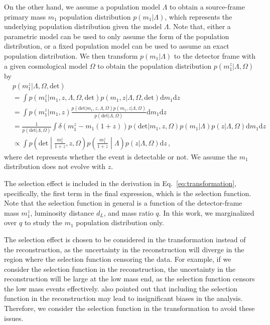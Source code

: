 \documentclass[sn-aps, pdflatex]{sn-jnl}
\begin{document}
On the other hand, we assume a population model $\Lambda$ to obtain a source-frame primary mass $m_1$ population distribution $p(m_1|\Lambda)$, which represents the underlying population distribution given the model $\Lambda$.
Note that, either a parametric model can be used to only assume the form of the population distribution, or a fixed population model can be used to assume an exact population distribution.
We then transform $p(m_1|\Lambda)$ to the detector frame with a given cosmological model $\Omega$ to obtain the population distribution $p(m^z_1|\Lambda, \Omega)$ by
\begin{equation}
    \begin{aligned}
        &p(m^z_1|\Lambda, \Omega, \mathrm{det}) \\
        &= \int p(m^z_1|m_1, z, \Lambda, \Omega, \mathrm{det}) p(m_1, z|\Lambda, \Omega, \mathrm{det}) \mathrm{d}m_1 \mathrm{d}z \\
        &= \int p(m^z_1|m_1, z) \frac{p(\mathrm{det}|m_1, z, \Lambda, \Omega)p(m_1, z|\Lambda, \Omega)}{p(\mathrm{det}|\Lambda, \Omega)} \mathrm{d}m_1 \mathrm{d}z \\
        &= \frac{1}{p(\mathrm{det}|\Lambda, \Omega)}\int \delta(m^z_1-m_1(1+z))p(\mathrm{det}|m_1, z, \Omega)p(m_1|\Lambda)p(z|\Lambda, \Omega) \mathrm{d}m_1 \mathrm{d}z \\
        &\propto \int p\left(\mathrm{det}\middle|\frac{m^z_1}{1+z},z,\Omega\right)p\left(\frac{m^z_1}{1+z}\middle|\Lambda\right)p(z|\Lambda, \Omega) \mathrm{d}z\,,
    \end{aligned}
    \label{eq:transformation}
\end{equation}
where $\mathrm{det}$ represents whether the event is detectable or not.
We assume the $m_1$ distribution does not evolve with $z$.

The selection effect is included in the derivation in Eq.~\eqref{eq:transformation}, specifically, the first term in the final expression, which is the selection function.
Note that the selection function in general is a function of the detector-frame mass $m^z_1$, luminosity distance $d_L$, and mass ratio $q$.
In this work, we marginalized over $q$ to study the $m_1$ population distribution only.

The selection effect is chosen to be considered in the transformation instead of the reconstruction, as the uncertainty in the reconstruction will diverge in the region where the selection function censoring the data.
For example, if we consider the selection function in the reconstruction, the uncertainty in the reconstruction will be large at the low mass end, as the selection function censors the low mass events effectively.
\cite{Essick:2023upv} also pointed out that including the selection function in the reconstruction may lead to insignificant biases in the analysis.
Therefore, we consider the selection function in the transformation to avoid these issues.
\end{document}
